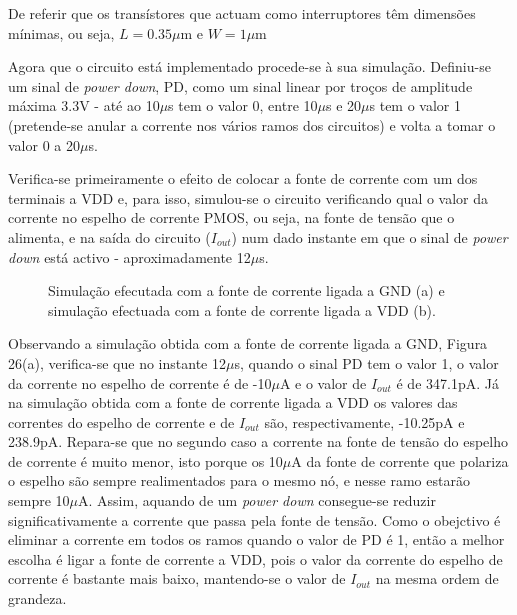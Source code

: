 \documentclass[11pt]{article}
\numberwithin{equation}{section}
\begin{document}
De referir que os transístores que actuam como interruptores têm dimensões mínimas, ou seja, $L = 0.35\mu$m e $W = 1\mu$m

Agora que o circuito está implementado procede-se à sua simulação. Definiu-se um sinal de \textit{power down}, PD, como um sinal linear por troços de amplitude máxima 3.3V - até ao 10$\mu$s tem o valor 0, entre 10$\mu$s e 20$\mu$s tem o valor 1 (pretende-se anular a corrente nos vários ramos dos circuitos) e volta a tomar o valor 0 a 20$\mu$s. 

Verifica-se primeiramente o efeito de colocar a fonte de corrente com um dos terminais a VDD e, para isso, simulou-se o circuito verificando qual o valor da corrente no espelho de corrente PMOS, ou seja, na fonte de tensão que o alimenta, e na saída do circuito ($I_{out}$) num dado instante em que o sinal de \textit{power down} está activo - aproximadamente 12$\mu$s.

\begin{figure}[H]
	\centering
\end{figure}

\begin{figure}[H]
	\vspace{-0.8em}
	\caption{Simulação efecutada com a fonte de corrente ligada a GND (a) e simulação efectuada com a fonte de corrente ligada a VDD (b).}
	\vspace{-0.8em}
\end{figure}

Observando a simulação obtida com a fonte de corrente ligada a GND, Figura 26(a), verifica-se que no instante 12$\mu$s, quando o sinal PD tem o valor 1, o valor da corrente no espelho de corrente é de -10$\mu$A e o valor de $I_{out}$ é de 347.1pA. Já na simulação obtida com a fonte de corrente ligada a VDD os valores das correntes do espelho de corrente e de $I_{out}$ são, respectivamente, -10.25pA e  238.9pA. Repara-se que no segundo caso a corrente na fonte de tensão do espelho de corrente é muito menor, isto porque os 10$\mu$A da fonte de corrente que polariza o espelho são sempre realimentados para o mesmo nó, e nesse ramo estarão sempre 10$\mu$A. Assim, aquando de um \textit{power down} consegue-se reduzir significativamente a corrente que passa pela fonte de tensão. Como o obejctivo é eliminar a corrente em todos os ramos quando o valor de PD é 1, então a melhor escolha é ligar a fonte de corrente a VDD, pois o valor da corrente do espelho de corrente é bastante mais baixo, mantendo-se o valor de $I_{out}$ na mesma ordem de grandeza.
\end{document}
